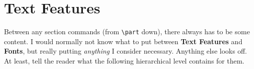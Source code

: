 \section{Text Features}
Between any section commands (from \verb|\part| down), there always has to be some content.
I would normally not know what to put between \textbf{Text Features} and \textbf{Fonts}, but really putting \textit{anything} I consider necessary.
Anything else looks off.
At least, tell the reader what the following hierarchical level contains for them.